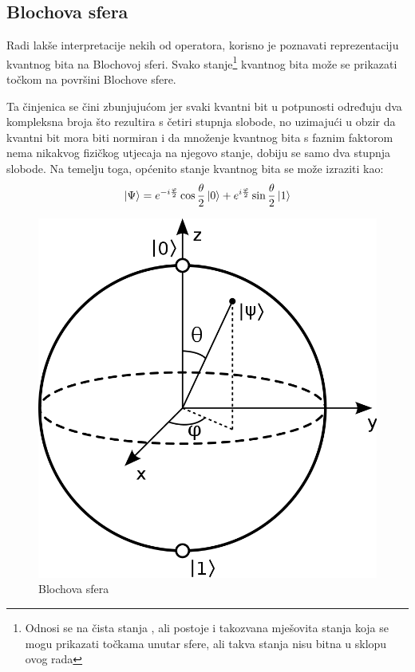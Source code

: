 \subsection{Blochova sfera}

Radi lakše interpretacije nekih od operatora, korisno je poznavati reprezentaciju kvantnog bita na Blochovoj sferi. Svako stanje\footnote{Odnosi se na čista stanja , ali postoje i takozvana mješovita stanja koja se mogu prikazati točkama unutar sfere, ali takva stanja nisu bitna u sklopu ovog rada} kvantnog bita može se prikazati točkom na površini Blochove sfere.

Ta činjenica se čini zbunjujućom jer svaki kvantni bit u potpunosti određuju dva kompleksna broja što rezultira s četiri stupnja slobode, no uzimajući u obzir da kvantni bit mora biti normiran i da množenje kvantnog bita s faznim faktorom nema nikakvog fizičkog utjecaja na njegovo stanje, dobiju se samo dva stupnja slobode. Na temelju toga, općenito stanje kvantnog bita se može izraziti kao:
\begin{equation}
\ket{\Psi} = e^{-i\frac{\varphi}{2}}\cos\frac{\theta}{2}\ket{0} + e^{i\frac{\varphi}{2}}\sin\frac{\theta}{2}\ket{1}
\end{equation}

\begin{figure}[H]
\centering
\includegraphics[scale=0.2]{img/bloch.png}
\caption{Blochova sfera} 
\end{figure}

